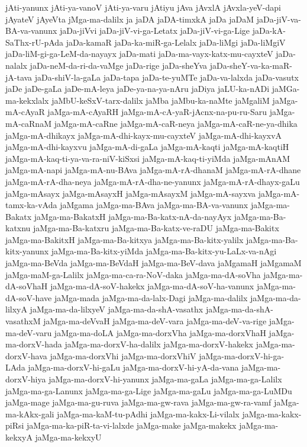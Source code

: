 {jAti-yanunx
jAti-ya-vanoV
jAti-ya-varu
jAtiyu
jAva
jAvxlA
jAvxla-yeV-dapi
jAyateV
jAyeVta
jMga-ma-dalilx
ja
jaDA
jaDA-timxkA
jaDa
jaDaM
jaDa-jiV-va-BA-va-vanunx
jaDa-jiVvi
jaDa-jiV-vi-ga-Letatx
jaDa-jiV-vi-ga-Lige
jaDa-kA-SaThx-rU-pAda
jaDa-kamaR
jaDa-ka-miR-ga-Lelalx
jaDa-liMgi
jaDa-liMgiV
jaDa-liM-gi-ga-LeM-da-nayayx
jaDa-mati
jaDa-ma-vayx-katx-mu-cayxteV
jaDa-nalalx
jaDa-neM-da-ri-da-vaMge
jaDa-rige
jaDa-sheYva
jaDa-sheY-va-ka-maR-jA-tava
jaDa-shiV-la-gaLa
jaDa-tapa
jaDa-te-yuMTe
jaDa-va-lalxda
jaDa-vasutx
jaDe
jaDe-gaLa
jaDe-mA-leya
jaDe-ya-na-ya-nAru
jaDiya
jaLU-ka-nADi
jaMGa-ma-kekxlalx
jaMbU-keSxV-tarx-dalilx
jaMba
jaMbu-ka-naMte
jaMgaliM
jaMga-mA-cAyaR
jaMga-mA-cAyaRH
jaMga-mA-cA-yaR-jAcnx-na-pu-ru-Saru
jaMga-mA-caRnaM
jaMga-mA-caRne
jaMga-mA-caR-neya
jaMga-mA-caR-ne-ya-dhika
jaMga-mA-dhikayx
jaMga-mA-dhi-kayx-mu-cayxteV
jaMga-mA-dhi-kayxvA
jaMga-mA-dhi-kayxvu
jaMga-mA-di-gaLa
jaMga-mA-kaqti
jaMga-mA-kaqtiH
jaMga-mA-kaq-ti-ya-va-ra-niV-kiSxsi
jaMga-mA-kaq-ti-yiMda
jaMga-mAnAM
jaMga-mA-napi
jaMga-mA-nu-BAva
jaMga-mA-rA-dhanaM
jaMga-mA-rA-dhane
jaMga-mA-rA-dha-neya
jaMga-mA-rA-dha-ne-yanunx
jaMga-mA-rA-dhayx-gaLu
jaMga-mAsayx
jaMga-mAsayxH
jaMga-mAsayxM
jaMga-mA-sayxva
jaMga-mA-tamx-ka-vAda
jaMgama
jaMga-ma-BAva
jaMga-ma-BA-va-vanunx
jaMga-ma-Bakatx
jaMga-ma-BakatxH
jaMga-ma-Ba-katx-nA-da-nayAyx
jaMga-ma-Ba-katxnu
jaMga-ma-Ba-katxru
jaMga-ma-Ba-katx-ve-raDU
jaMga-ma-Bakitx
jaMga-ma-BakitxH
jaMga-ma-Ba-kitxya
jaMga-ma-Ba-kitx-yalilx
jaMga-ma-Ba-kitx-yanunx
jaMga-ma-Ba-kitx-yiMda
jaMga-ma-Ba-kitx-yu-LaLx-va-nAgi
jaMga-ma-BeVda
jaMga-ma-BeVdaH
jaMga-ma-BeV-dava
jaMgamaH
jaMgamaM
jaMga-maM-ga-Lalilx
jaMga-ma-ca-ra-NoV-daka
jaMga-ma-dA-soVha
jaMga-ma-dA-soVhaH
jaMga-ma-dA-soV-hakekx
jaMga-ma-dA-soV-ha-vanunx
jaMga-ma-dA-soV-have
jaMga-mada
jaMga-ma-da-lalx-Dagi
jaMga-ma-dalilx
jaMga-ma-da-lilxyA
jaMga-ma-da-lilxyeV
jaMga-ma-da-shA-vasathx
jaMga-ma-da-shA-vasathxM
jaMga-ma-deVvaH
jaMga-ma-deV-vara
jaMga-ma-deV-va-rige
jaMga-ma-deV-varu
jaMga-ma-doLA
jaMga-ma-dorxVha
jaMga-ma-dorxVhaH
jaMga-ma-dorxV-hada
jaMga-ma-dorxV-ha-dalilx
jaMga-ma-dorxV-hakekx
jaMga-ma-dorxV-hava
jaMga-ma-dorxVhi
jaMga-ma-dorxVhiV
jaMga-ma-dorxV-hi-ga-LAda
jaMga-ma-dorxV-hi-gaLu
jaMga-ma-dorxV-hi-yA-da-vana
jaMga-ma-dorxV-hiya
jaMga-ma-dorxV-hi-yanunx
jaMga-ma-gaLa
jaMga-ma-ga-Lalilx
jaMga-ma-ga-Lanunx
jaMga-ma-ga-Lige
jaMga-ma-gaLu
jaMga-ma-ga-LuMDu
jaMga-mage
jaMga-ma-gu-ruva
jaMga-ma-gw-rava
jaMga-ma-gw-ra-vamf
jaMga-ma-kAkx-gali
jaMga-ma-kaM-tu-pAdhi
jaMga-ma-kakx-Li-vilalx
jaMga-ma-kakx-piRsi
jaMga-ma-ka-piR-ta-vi-lalxde
jaMga-make
jaMga-makekx
jaMga-ma-kekxyA
jaMga-ma-kekxyU
}
